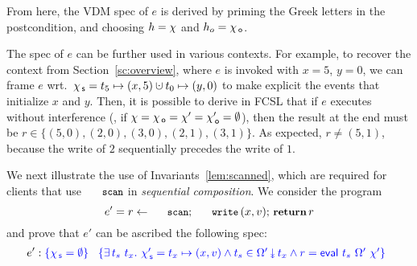 From here, the VDM spec of $e$ is derived by priming the Greek letters
in the postcondition, and choosing $h = \chi$ and $h_o = \chi_{\, \mathsf{o}}$.

The spec of $e$ can be further used in various contexts. For example,
to recover the context from Section~\ref{sc:overview}, where $e$ is
invoked with $x = 5$, $y = 0$, we can frame $e$ wrt.~$\histS = t_5
\hpts (x, 5) \hunion t_0 \hpts (y, 0)$ to make explicit the events
that initialize $x$ and $y$. Then, 
%
%
it is possible to derive in FCSL that if $e$ executes without
interference (\ie, if $\chi = \chi_{\, \mathsf{o}} = \chi' = \chi_{\, \mathsf{o}}' = \emptyset$),
then the result at the end must be $r \in \{(5,0), (2,0), (3,0),
(2,1), (3,1)\}$. As expected, $r \neq (5, 1)$, because the write of
$2$ sequentially precedes the write of $1$.

We next illustrate the use of Invariants~\ref{lem:scanned}, which are
required for clients that use $\esc{scan}$ in \emph{sequential
  composition}. We consider the program
%
\[
\hfill{
e' = r \tbnd \esc{scan} ;\, \esc{write}\, (x,v);\, {\small{\kw{return}}}\, r 
}\hfill
\]
%
and prove that $e'$ can be ascribed the following spec:
\[
\hfill
e' : \tsPre{\{ \histS = \hempty \}} \
\begin{array}[t]{l}
     \tsPos{\{ \exists\, t_s\ t_x\ldot\,
       \histSP = t_x \hpts (x, v) \wedge
       t_s \in \sideal{\stableorderP}{t_x} \wedge %
           r = \eval\ t_s\ \stableorderP\ \histP \}}
\end{array}\hfill
\]

